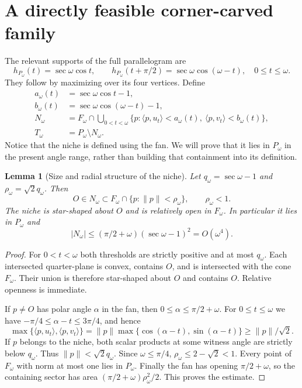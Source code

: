\documentclass[11pt]{article}
\newtheorem{lemma}[theorem]{Lemma}
\theoremstyle{remark}\newtheorem{remark}[theorem]{Remark}
\newcommand{\area}[1]{\lvert #1\rvert}
\newcommand{\ip}[2]{\langle #1,#2\rangle}
\begin{document}
\section{A directly feasible corner-carved family}
The relevant supports of the full parallelogram are
\begin{equation}\label{eq:P-support}
 h_{P_\omega}(t)=\sec\omega\cos t,\qquad
 h_{P_\omega}(t+\pi/2)=\sec\omega\cos(\omega-t),\quad 0\le t\le\omega.
\end{equation}
They follow by maximizing over its four vertices. Define
\begin{align*}
 a_\omega(t)&=\sec\omega\cos t-1,\\
 b_\omega(t)&=\sec\omega\cos(\omega-t)-1,\\
 N_\omega&=F_\omega\cap\bigcup_{0<t<\omega}
 \{p:\ip p{u_t}<a_\omega(t),\ \ip p{v_t}<b_\omega(t)\},\\
 T_\omega&=P_\omega\setminus N_\omega.
\end{align*}
Notice that the niche is defined using the fan. We will prove that it lies in $P_\omega$ in the present angle range, rather than building that containment into its definition.

\begin{lemma}[Size and radial structure of the niche]\label{lem:niche-size}
Let $q_\omega=\sec\omega-1$ and $\rho_\omega=\sqrt2 q_\omega$. Then
\[
 O\in N_\omega\subset F_\omega\cap\{p:\lVert p\rVert<\rho_\omega\},\qquad \rho_\omega<1.
\]
The niche is star-shaped about $O$ and is relatively open in $F_\omega$. In particular it lies in $P_\omega$ and
\[
 \area{N_\omega}\le(\pi/2+\omega)(\sec\omega-1)^2=O(\omega^4).
\]
\end{lemma}
\begin{proof}
For $0<t<\omega$ both thresholds are strictly positive and at most $q_\omega$. Each intersected quarter-plane is convex, contains $O$, and is intersected with the cone $F_\omega$. Their union is therefore star-shaped about $O$ and contains $O$. Relative openness is immediate.

If $p\ne O$ has polar angle $\alpha$ in the fan, then $0\le\alpha\le\pi/2+\omega$. For $0\le t\le\omega$ we have $-\pi/4\le\alpha-t\le3\pi/4$, and hence
\[
 \max\{\ip p{u_t},\ip p{v_t}\}
 =\lVert p\rVert\max\{\cos(\alpha-t),\sin(\alpha-t)\}
 \ge\lVert p\rVert/\sqrt2.
\]
If $p$ belongs to the niche, both scalar products at some witness angle are strictly below $q_\omega$. Thus $\lVert p\rVert<\sqrt2 q_\omega$. Since $\omega\le\pi/4$, $\rho_\omega\le2-\sqrt2<1$.
Every point of $F_\omega$ with norm at most one lies in $P_\omega$. Finally the fan has opening $\pi/2+\omega$, so the containing sector has area $(\pi/2+\omega)\rho_\omega^2/2$. This proves the estimate.
\end{proof}
\end{document}
